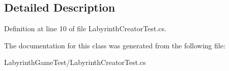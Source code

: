 \subsection{Detailed Description}


Definition at line 10 of file Labyrinth\+Creator\+Test.\+cs.



The documentation for this class was generated from the following file\+:\begin{DoxyCompactItemize}
\item 
Labyrinth\+Game\+Test/Labyrinth\+Creator\+Test.\+cs\end{DoxyCompactItemize}

